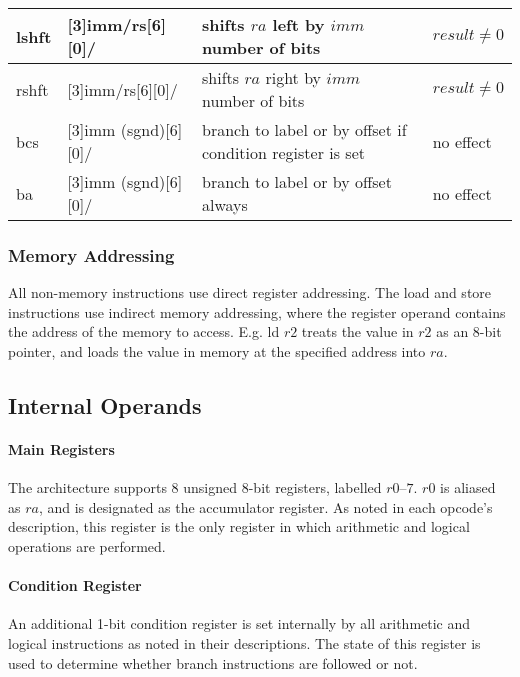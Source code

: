 \documentclass{article}
\begin{document}
{\begin{tabu}{ | l | l | p{4cm} | p{2.45cm} | }
        lshft & {\centering {}[3]{imm/rs}[6]{}[0]/} & shifts $ra$ left by $imm$ number of bits & $result \neq 0$ \\ \hline
        rshft & {\centering {}[3]{imm/rs}[6]{}[0]/} & shifts $ra$ right by $imm$ number of bits & $result \neq 0$ \\ \hline
        bcs & {\centering {}[3]{imm (sgnd)}[6]{}[0]/} & branch to label or by offset if condition register is set & no effect \\ \hline
        ba & {\centering {}[3]{imm (sgnd)}[6]{}[0]/} & branch to label or by offset always & no effect \\
        \hline
    \end{tabu}}

    \subsubsection{Memory Addressing}

    All non-memory instructions use direct register addressing. The load and
    store instructions use indirect memory addressing, where the register
    operand contains the address of the memory to access. E.g. ld $r2$ treats
    the value in $r2$ as an 8-bit pointer, and loads the value in memory at the
    specified address into $ra$.

    \subsection{Internal Operands}

    \paragraph{Main Registers}
    The architecture supports 8 unsigned 8-bit registers, labelled
    $r\numrange{0}{7}$. $r0$ is aliased as $ra$, and is designated as the
    accumulator register. As noted in each opcode's description, this
    register is the only register in which arithmetic and logical operations
    are performed.

    \paragraph{Condition Register}
    An additional 1-bit condition register is set internally by all arithmetic
    and logical instructions as noted in their descriptions. The state of this
    register is used to determine whether branch instructions are followed or
    not.
\end{document}
